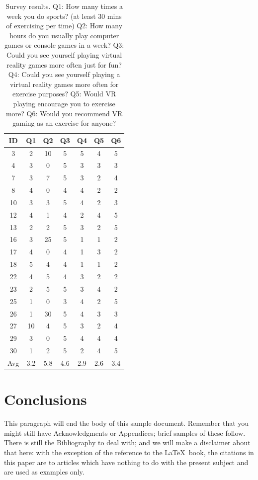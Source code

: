 \documentclass{sig-alternate-05-2015}
\begin{document}
\begin{table}
\centering
\caption
{
    Survey results.
    Q1: How many times a week you do sports? (at least 30 mins of exercising per time)
    Q2: How many hours do you usually play computer games or console games in a week?
    Q3: Could you see yourself playing virtual reality games more often just for fun?
    Q4: Could you see yourself playing a virtual reality games more often for exercise purposes?
    Q5: Would VR playing encourage you to exercise more?
    Q6: Would you recommend VR gaming as an exercise for anyone?
}
\begin{tabular}{c|c c c c c c} \hline
    ID&Q1&Q2&Q3&Q4&Q5&Q6 \\ \hline
    3&2&10&5&5&4&5\\
    4&3&0&5&3&3&3\\
    7&3&7&5&3&2&4\\
    8&4&0&4&4&2&2\\
    10&3&3&5&4&2&3\\
    12&4&1&4&2&4&5\\
    13&2&2&5&3&2&5\\
    16&3&25&5&1&1&2\\
    17&4&0&4&1&3&2\\
    18&5&4&4&1&1&2\\
    22&4&5&4&3&2&2\\
    23&2&5&5&3&4&2\\
    25&1&0&3&4&2&5\\
    26&1&30&5&4&3&3\\
    27&10&4&5&3&2&4\\
    29&3&0&5&4&4&4\\
    30&1&2&5&2&4&5\\ \hline
    Avg&3.2&5.8&4.6&2.9&2.6&3.4
\end{tabular}
\end{table}

\section{Conclusions}
This paragraph will end the body of this sample document.
Remember that you might still have Acknowledgments or
Appendices; brief samples of these
follow.  There is still the Bibliography to deal with; and
we will make a disclaimer about that here: with the exception
of the reference to the \LaTeX\ book, the citations in
this paper are to articles which have nothing to
do with the present subject and are used as
examples only.
\end{document}
